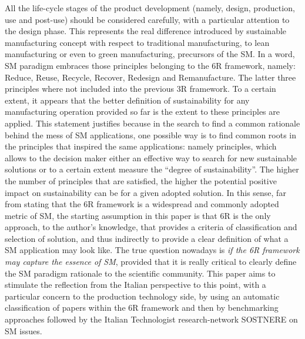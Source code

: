 \documentclass[]{book}
\theoremstyle{definition}
\theoremstyle{definition}
\theoremstyle{definition}
\theoremstyle{remark}
\begin{document}
All the life-cycle stages of the product development (namely, design,
production, use and post-use) should be considered carefully, with a
particular attention to the design phase. This represents the real
difference introduced by sustainable manufacturing concept with respect
to traditional manufacturing, to lean manufacturing or even to green
manufacturing, precursors of the SM. In a word, SM paradigm embraces
those principles belonging to the 6R framework, namely: Reduce, Reuse,
Recycle, Recover, Redesign and Remanufacture. The latter three
principles where not included into the previous 3R framework. To a
certain extent, it appears that the better definition of sustainability
for any manufacturing operation provided so far is the extent to these
principles are applied. This statement justifies because in the search
to find a common rationale behind the mess of SM applications, one
possible way is to find common roots in the principles that inspired the
same applications: namely principles, which allows to the decision maker
either an effective way to search for new sustainable solutions or to a
certain extent measure the ``degree of sustainability''. The higher the
number of principles that are satisfied, the higher the potential
positive impact on sustainability can be for a given adopted solution.
In this sense, far from stating that the 6R framework is a widespread
and commonly adopted metric of SM, the starting assumption in this paper
is that 6R is the only approach, to the author's knowledge, that
provides a criteria of classification and selection of solution, and
thus indirectly to provide a clear definition of what a SM application
may look like. The true question nowadays is \emph{if the 6R framework
may capture the essence of SM}, provided that it is really critical to
clearly define the SM paradigm rationale to the scientific community.
This paper aims to stimulate the reflection from the Italian perspective
to this point, with a particular concern to the production technology
side, by using an automatic classification of papers within the 6R
framework and then by benchmarking approaches followed by the Italian
Technologist research-network SOSTNERE on SM issues.
\end{document}
